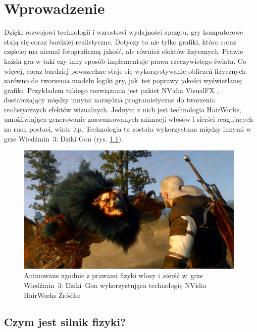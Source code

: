 
\chapter{Wprowadzenie}
Dzięki rozwojowi technologii i wzrostowi wydajności sprzętu, gry komputerowe stają się coraz bardziej realistyczne. Dotyczy to nie tylko grafiki, która coraz częściej ma niemal fotograficzną jakość, ale również efektów fizycznych. Prawie każda gra w taki czy inny sposób implementuje prawa rzeczywistego świata. Co więcej, coraz bardziej powszechne staje się wykorzystywanie obliczeń fizycznych zarówno do tworzenia modelu logiki gry, jak~też poprawy jakości wyświetlanej grafiki. Przykładem takiego rozwiązania jest pakiet NVidia VisualFX \cite{bib:nvidia-visualfx}, dostarczający między innymi narzędzia programistyczne do tworzenia realistycznych efektów wizualnych. Jednym z nich jest technologia HairWorks, umożliwiająca generowanie zaawansowanych animacji włosów i sierści reagujących na ruch postaci, wiatr itp. Technologia ta została wykorzystana między innymi w grze Wiedźmin~3: Dziki Gon (rys. \ref{fig:geralt-hairworks}).

\begin{figure}[ht]
	\centering
	\includegraphics[width=0.7\linewidth]{images/geralt-hairworks}
	\caption[Animowane zgodnie z prawami fizyki włosy i~sierść w~grze Wiedźmin~3: Dziki~Gon wykorzystująca technologię NVidia HairWorks]{Animowane zgodnie z prawami fizyki włosy i~sierść w~grze Wiedźmin~3: Dziki~Gon wykorzystująca technologię NVidia HairWorks\newline
		Źródło: \cite{bib:geralt-hairworks}}
	\label{fig:geralt-hairworks}
\end{figure}
\section{Czym jest silnik fizyki?}

